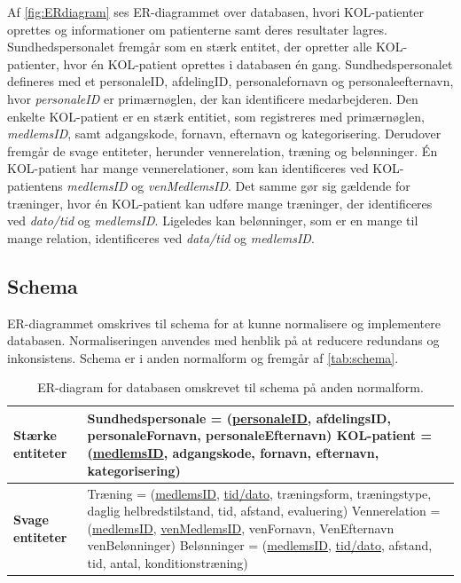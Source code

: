 \noindent
Af \autoref{fig:ERdiagram} ses ER-diagrammet over databasen, hvori KOL-patienter oprettes og informationer om patienterne samt deres resultater lagres. Sundhedspersonalet fremgår som en stærk entitet, der opretter alle KOL-patienter, hvor én KOL-patient oprettes i databasen én gang. Sundhedspersonalet defineres med et personaleID, afdelingID, personalefornavn og personaleefternavn, hvor \textit{personaleID} er primærnøglen, der kan identificere medarbejderen. Den enkelte KOL-patient er en stærk entitiet, som registreres med primærnøglen, \textit{medlemsID}, samt adgangskode, fornavn, efternavn og kategorisering. Derudover fremgår de svage entiteter, herunder vennerelation, træning og belønninger. Én KOL-patient har mange vennerelationer, som kan identificeres ved KOL-patientens \textit{medlemsID} og \textit{venMedlemsID}. Det samme gør sig gældende for træninger, hvor én KOL-patient kan udføre mange træninger, der identificeres ved  \textit{dato/tid} og \textit{medlemsID}. Ligeledes kan belønninger, som er en mange til mange relation, identificeres ved \textit{data/tid} og \textit{medlemsID}.

\subsection{Schema}
ER-diagrammet omskrives til schema for at kunne normalisere og implementere databasen. Normaliseringen anvendes med henblik på at reducere redundans og inkonsistens. Schema er i anden normalform og fremgår af \autoref{tab:schema}. 

\begin{table} [H]
	\centering
  \begin{tabular}{ | l | p{12cm} |} \hline
     \textbf{Stærke entiteter} & Sundhedspersonale = (\underline{personaleID}, afdelingsID, personaleFornavn, personaleEfternavn)
\newline KOL-patient = (\underline{medlemsID}, adgangskode, fornavn, efternavn, kategorisering) \\ \hline
 	\textbf{Svage entiteter} & Træning = (\underline{medlemsID}, \underline{tid/dato}, træningsform, træningstype, daglig helbredstilstand, tid, afstand, evaluering)
 \newline Vennerelation = (\underline{medlemsID}, \underline{venMedlemsID}, venFornavn, VenEfternavn venBelønninger)
\newline Belønninger = (\underline{medlemsID}, \underline{tid/dato}, afstand, tid, antal, konditionstræning)\\ \hline
    \end{tabular}
    \caption{ER-diagram for databasen omskrevet til schema på anden normalform.}
    \label{tab:schema}
\end{table}


